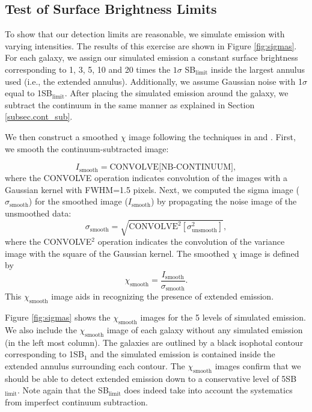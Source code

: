 \documentclass[twocolumn]{aastex61}
\begin{document}
\subsection{Test of Surface Brightness Limits}\label{subsec:test}
To show that our detection limits are reasonable, we simulate emission with varying intensities. The results of this exercise are shown in Figure \ref{fig:sigmas}. For each galaxy, we assign our simulated emission a constant surface brightness corresponding to 1, 3, 5, 10 and 20 times the $1\sigma$ SB$_{\text{limit}}$ inside the largest annulus used (i.e., the extended annulus). Additionally, we assume Gaussian noise with 1$\sigma$ equal to 1SB$_{\text{limit}}$. After placing the simulated emission around the galaxy, we subtract the continuum in the same manner as explained in Section \ref{subsec.cont_sub}. 

We then construct a smoothed $\chi$ image following the techniques in \cite{Hennawi2013} and \cite{Battaia_2015}. First, we smooth the continuum-subtracted image:

\begin{equation}
I_{\text{smooth}}= \text{CONVOLVE[NB-CONTINUUM]},
\end{equation}
where the CONVOLVE operation indicates convolution of the images with a Gaussian kernel with FWHM=1.5 pixels. Next, we computed the sigma image ($\sigma_{\text{smooth}}$) for the smoothed image ($I_{\text{smooth}}$) by propagating the noise image of the unsmoothed data:
\begin{equation}
\sigma_{\text{smooth}}=\sqrt{\text{CONVOLVE}^2[\sigma^2_{\text{unsmooth}}]},
\end{equation}
where the CONVOLVE$^2$ operation indicates the convolution of the variance image with the square of the Gaussian kernel. The smoothed $\chi$ image is defined by
\begin{equation}
\chi_{\text{smooth}}=\frac{I_{\text{smooth}}}{\sigma_{\text{smooth}}}.
\end{equation}
This $\chi_{\text{smooth}}$ image aids in recognizing the presence of extended  emission. 

Figure \ref{fig:sigmas} shows the $\chi_{\text{smooth}}$ images for the 5 levels of simulated  emission. We also include the $\chi_{\text{smooth}}$ image of each galaxy without any simulated emission (in the left most column). The galaxies are outlined by a black isophotal contour corresponding to 1SB$_1$ and the simulated emission is contained inside the extended annulus surrounding each contour. The  $\chi_{\text{smooth}}$ images confirm that we should be able to detect extended  emission down to a conservative level of 5SB$_{\text{limit}}$. Note again that the SB$_{\text{limit}}$ does indeed take into account the systematics from imperfect continuum subtraction. 
\end{document}
